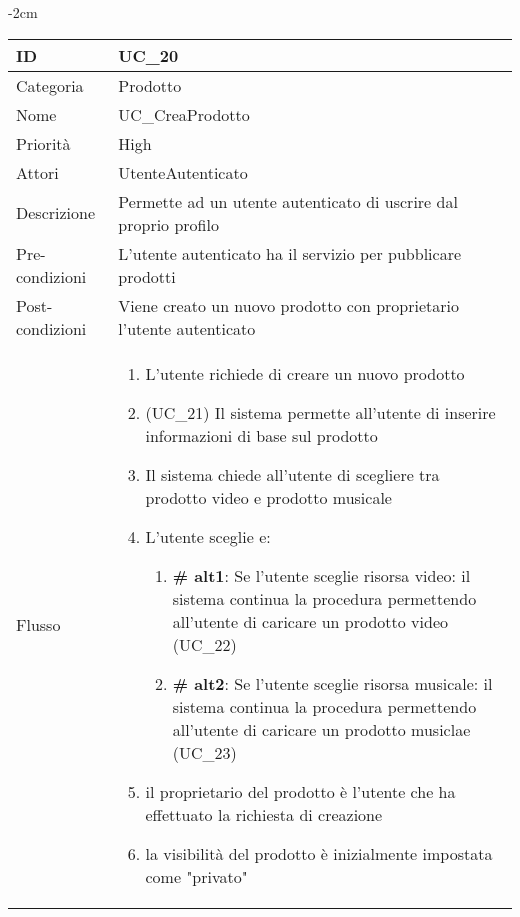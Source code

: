 \begin{center}
\begin{table}[bp]
    \centering
    \addtolength{\leftskip} {-2cm}
\begin{tabular}{ |p{2.6cm}|p{13cm}|  }
\hline
ID & UC\_20\\\hline
Categoria & Prodotto \\\hline
Nome & UC\_CreaProdotto \\\hline
Priorità & High \\\hline
Attori &  UtenteAutenticato \\\hline
Descrizione & Permette ad un utente autenticato di uscrire dal proprio profilo \\\hline
Pre-condizioni &  L'utente autenticato ha il servizio per pubblicare prodotti\\\hline
Post-condizioni &  Viene creato un nuovo prodotto con proprietario l'utente autenticato\\\hline
Flusso &  	\begin{enumerate}
			\item L'utente richiede di creare un nuovo prodotto
			\item (UC\_21) Il sistema permette all'utente di inserire informazioni di base sul prodotto
			\item Il sistema chiede all'utente di scegliere tra prodotto video e prodotto musicale
			\item L'utente sceglie e:
			\begin{enumerate}[  ]
				\item \textbf{\# alt1}: Se l'utente sceglie risorsa video: il sistema continua la procedura permettendo all'utente di caricare un prodotto video (UC\_22)
				\item \textbf{\# alt2}: Se l'utente sceglie risorsa musicale: il sistema continua la procedura permettendo all'utente di caricare un prodotto musiclae (UC\_23)
			\end{enumerate}
			\item il proprietario del prodotto è l'utente che ha effettuato la richiesta di creazione
			\item la visibilità del prodotto è inizialmente impostata come "privato"
		\end{enumerate}\\\hline
\end{tabular}
\label{table_use_case:20}\newline
\end{table}


\end{center}
